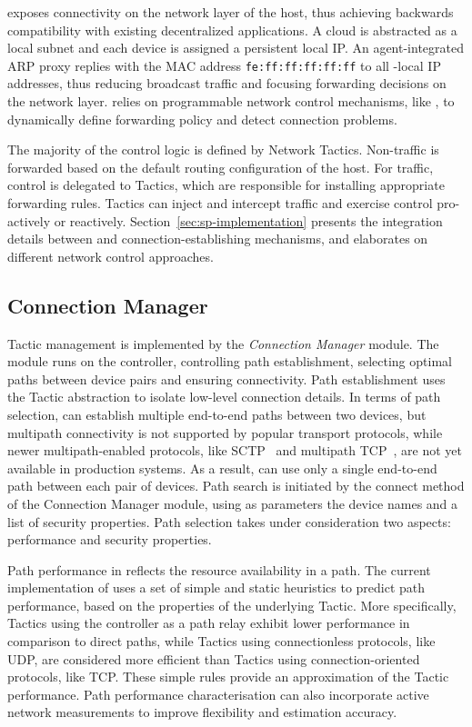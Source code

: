 \signpost exposes connectivity on the network layer of the host, thus achieving
backwards compatibility with existing decentralized applications. A \signpost
cloud is abstracted as a local subnet and each device is assigned a persistent
local IP\@. An agent-integrated ARP proxy
replies with the MAC address \texttt{fe:ff:ff:ff:ff:ff}\/ to all \signpost-local
IP addresses, thus reducing broadcast traffic and focusing forwarding decisions
on the network layer.  \signpost relies on programmable network control
mechanisms, like \of, to dynamically define forwarding policy and
detect connection problems.

The majority of the \signpost control logic is defined by Network Tactics.
Non-\signpost traffic is forwarded based on the default routing configuration
of the host.  For \signpost traffic, control is delegated to Tactics, which are
responsible for installing appropriate forwarding rules.  Tactics can inject
and intercept traffic and exercise control pro-actively or reactively.
Section~\ref{sec:sp-implementation} presents the  integration details between
\signpost and connection-establishing mechanisms, and elaborates on different
network control approaches.

\subsection{Connection Manager} \label{sec:sp-engine}

\signpost Tactic management is implemented by the \textit{Connection Manager}
module.  The module runs on the \signpost controller, controlling path
establishment, selecting optimal paths between device pairs and ensuring
connectivity.  Path establishment uses the Tactic abstraction to isolate
low-level connection details.  In terms of path selection, \signpost can
establish multiple end-to-end paths between two devices, but multipath
connectivity is not supported by popular transport protocols, while newer
multipath-enabled protocols, like SCTP~ and multipath
TCP~, are not yet available in production systems.  As a result,
\signpost can use only a single end-to-end path between each pair of devices.
Path search is initiated by the connect method of the Connection Manager module,
using as parameters the device names and a list of security properties. Path
selection takes under consideration two aspects: performance and security
properties.

Path performance in \signpost reflects the resource availability in a path. The
current implementation of \signpost uses a set of simple and static heuristics
to predict path performance, based on the properties of the underlying Tactic.
More specifically, Tactics using the \signpost controller as a path relay exhibit
lower performance in comparison to direct paths, while Tactics using
connectionless protocols, like UDP, are considered more efficient than Tactics
using connection-oriented protocols, like TCP\@.  These simple rules provide an
approximation of the Tactic performance.  Path performance characterisation can
also incorporate active network measurements to improve flexibility and
estimation accuracy. 

